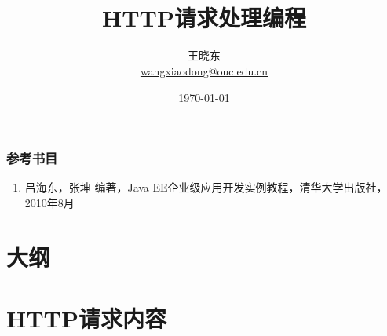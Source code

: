 
\title[KevinW@OUC]{\\  
HTTP请求处理编程}
\author[王晓东]{王晓东\\
  \href{mailto:wangxiaodong@ouc.edu.cn}{\footnotesize wangxiaodong@ouc.edu.cn}}
\date{\today}


 \frame{\titlepage}

\begin{frame}
\frametitle{参考书目}
\begin{enumerate}
\item 吕海东，张坤 编著，Java EE企业级应用开发实例教程，清华大学出版社，2010年8月
\end{enumerate}  
\end{frame}


\section*{大纲}

\section{HTTP请求内容}

